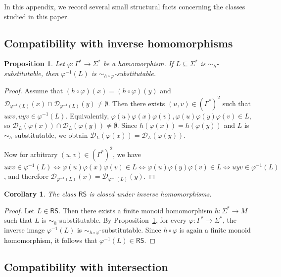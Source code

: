 \documentclass[11pt,a4paper]{article}
\newtheorem{proposition}[theorem]{Proposition}
\newtheorem{corollary}[theorem]{Corollary}
\newcommand{\D}{\mathcal{D}}
\begin{document}
In this appendix, we record several small structural facts concerning the classes studied in this paper.

\subsection{Compatibility with inverse homomorphisms}

\begin{proposition}\label{prop:invhom-fixed}
Let $\varphi:\Gamma^*\to\Sigma^*$ be a homomorphism. If $L\subseteq\Sigma^*$ is $\sim_h$-substitutable, then $\varphi^{-1}(L)$ is $\sim_{h\circ\varphi}$-substitutable.
\end{proposition}

\begin{proof}
Assume that $(h\circ\varphi)(x)=(h\circ\varphi)(y)$ and $\D_{\varphi^{-1}(L)}(x)\cap\D_{\varphi^{-1}(L)}(y)\neq\emptyset$. Then there exists $(u,v)\in(\Gamma^*)^2$ such that $uxv,uyv\in\varphi^{-1}(L)$. Equivalently, $\varphi(u)\varphi(x)\varphi(v),\varphi(u)\varphi(y)\varphi(v)\in L$, so $\D_L(\varphi(x))\cap\D_L(\varphi(y))\neq\emptyset$. Since $h(\varphi(x))=h(\varphi(y))$ and $L$ is $\sim_h$-substitutable, we obtain $\D_L(\varphi(x))=\D_L(\varphi(y))$.

Now for arbitrary $(u,v)\in(\Gamma^*)^2$, we have $uxv\in\varphi^{-1}(L) \iff \varphi(u)\varphi(x)\varphi(v)\in L \iff \varphi(u)\varphi(y)\varphi(v)\in L \iff uyv\in\varphi^{-1}(L)$, and therefore $\D_{\varphi^{-1}(L)}(x)=\D_{\varphi^{-1}(L)}(y)$.
\end{proof}

\begin{corollary}\label{cor:rs-invhom}
The class $\mathsf{RS}$ is closed under inverse homomorphisms.
\end{corollary}

\begin{proof}
Let $L\in\mathsf{RS}$. Then there exists a finite monoid homomorphism $h:\Sigma^*\to M$ such that $L$ is $\sim_h$-substitutable. By Proposition~\ref{prop:invhom-fixed}, for every $\varphi:\Gamma^*\to\Sigma^*$, the inverse image $\varphi^{-1}(L)$ is $\sim_{h\circ\varphi}$-substitutable. Since $h\circ\varphi$ is again a finite monoid homomorphism, it follows that $\varphi^{-1}(L)\in\mathsf{RS}$.
\end{proof}

\subsection{Compatibility with intersection}
\end{document}
